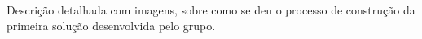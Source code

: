 Descrição detalhada com imagens, sobre como se deu o processo de construção da
primeira solução desenvolvida pelo grupo.
